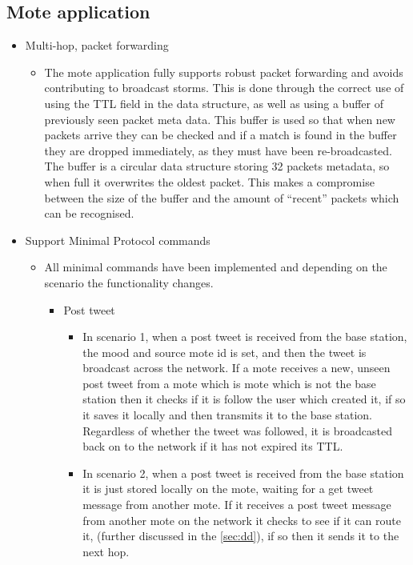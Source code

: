 \documentclass{article}
\begin{document}
\subsection{Mote application}
\begin{itemize}
	\item Multi-hop, packet forwarding
	\begin{itemize}
		\item The mote application fully supports robust packet forwarding and avoids contributing to broadcast storms. This is done through the correct use of using the TTL field in the data structure, as well as using a buffer of previously seen packet meta data. This buffer is used so that when new packets arrive they can be checked and if a match is found in the buffer they are dropped immediately, as they must have been re-broadcasted. The buffer is a circular data structure storing 32 packets metadata, so when full it overwrites the oldest packet. This makes a compromise between the size of the buffer and the amount of ``recent'' packets which can be recognised.
	\end{itemize}
	\item Support Minimal Protocol commands
	\begin{itemize}
		\item All minimal commands have been implemented and depending on the scenario the functionality changes.
		\begin{itemize}
			\item Post tweet
			\begin{itemize}
			 	\item In scenario 1, when a post tweet is received from the base station, the mood and source mote id is set, and then the tweet is broadcast across the network. If a mote receives a new, unseen post tweet from a mote which is mote which is not the base station then it checks if it is follow the user which created it, if so it saves it locally and then transmits it to the base station. Regardless of whether the tweet was followed, it is broadcasted back on to the network if it has not expired its TTL.
			 	\item In scenario 2, when a post tweet is received from the base station it is just stored locally on the mote, waiting for a get tweet message from another mote. If it receives a post tweet message from another mote on the network it checks to see if it can route it, (further discussed in the \ref{sec:dd}), if so then it sends it to the next hop.
			\end{itemize} 

\end{itemize}
\end{itemize}
\end{itemize}
\end{document}
